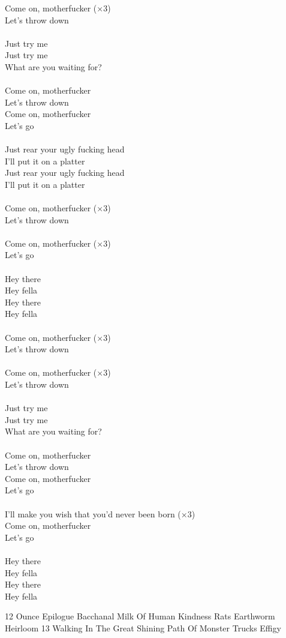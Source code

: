 \documentclass[10pt]{article}
\begin{document}
\begin{textblock*}{60mm}
Come on, motherfucker ($\times 3$)\\
Let's throw down \\
\\
Just try me \\
Just try me \\
What are you waiting for? \\
\\
Come on, motherfucker \\
Let's throw down \\
Come on, motherfucker \\
Let's go \\
\\
Just rear your ugly fucking head \\
I'll put it on a platter \\
Just rear your ugly fucking head \\
I'll put it on a platter \\
\\
Come on, motherfucker ($\times 3$)\\
Let's throw down \\
\\
Come on, motherfucker ($\times 3$)\\
Let's go \\
\\
Hey there \\
Hey fella \\
Hey there \\
Hey fella \\
\\
Come on, motherfucker ($\times 3$)\\
Let's throw down \\
\\
Come on, motherfucker ($\times 3$)\\
Let's throw down \\
\\
Just try me \\
Just try me \\
What are you waiting for? \\
\\
Come on, motherfucker \\
Let's throw down \\
Come on, motherfucker \\
Let's go \\
\\
I'll make you wish that you'd never been born ($\times 3$)\\
Come on, motherfucker \\
Let's go \\
\\
Hey there \\
Hey fella \\
Hey there \\
Hey fella \\
\end{textblock*}

\newpage

12 Ounce Epilogue
Bacchanal
Milk Of Human Kindness
Rats
Earthworm
Heirloom 13
Walking In The Great Shining Path Of Monster Trucks
Effigy 
\end{document}

